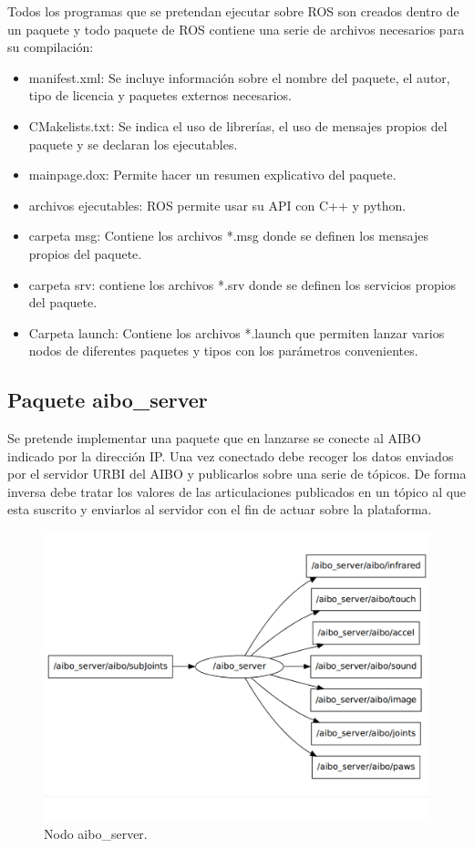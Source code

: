 \documentclass[12pt,a4paper,final,twoside]{book}
\begin{document}
Todos los programas que se pretendan ejecutar sobre ROS son creados dentro de un paquete y todo paquete de ROS contiene una serie de archivos necesarios para su compilación:
\begin{itemize}
\item manifest.xml: Se incluye información sobre el nombre del paquete, el autor, tipo de licencia y paquetes externos necesarios.
\item CMakelists.txt: Se indica el uso de librerías, el uso de mensajes propios del paquete y se declaran los ejecutables.
\item mainpage.dox: Permite hacer un resumen explicativo del paquete.
\item archivos ejecutables: ROS permite usar su API con C++ y python.
\item carpeta msg: Contiene los archivos *.msg donde se definen los mensajes propios del paquete.
\item carpeta srv: contiene los archivos *.srv donde se definen los servicios propios del paquete.
\item Carpeta launch: Contiene los archivos *.launch que permiten lanzar varios nodos de diferentes paquetes y tipos con los parámetros convenientes.

\end{itemize}
\subsection{Paquete aibo{\_}server }
Se pretende implementar una paquete que en lanzarse se conecte al AIBO indicado por la dirección IP. Una vez conectado debe recoger los datos enviados por el servidor URBI del AIBO y publicarlos sobre una serie de tópicos. De forma inversa debe tratar los valores de las articulaciones publicados en un tópico al que esta suscrito y enviarlos al servidor con el fin de actuar sobre la plataforma.

\begin{figure}[H]
	\centering
    \includegraphics[scale=0.6]{images/aiboserverNodo.pdf}
	 \caption{Nodo aibo{\_}server.}
  \label{fig:aiboserv}
\end{figure}
\end{document}
